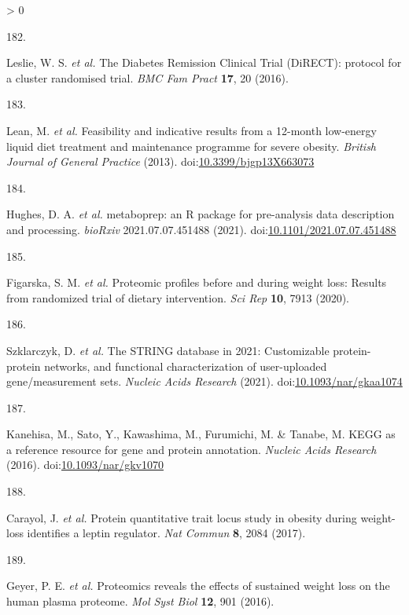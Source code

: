 \documentclass[11pt,twoside]{bristolthesis}
\newlength{\cslhangindent}
\newlength{\csllabelwidth}
\newenvironment{CSLReferences}[2] %
 {%
  \setlength{\parindent}{0pt}
  \ifodd #1 \everypar{\setlength{\hangindent}{\cslhangindent}}\ignorespaces\fi
  \ifnum #2 > 0
  \setlength{\parskip}{#2\baselineskip}
  \fi
 }%
 {}
\newcommand{\CSLLeftMargin}[1]{\parbox[t]{\csllabelwidth}{#1}}
\newcommand{\CSLRightInline}[1]{\parbox[t]{\linewidth - \csllabelwidth}{#1}\break}
\begin{document}
\begin{CSLReferences}{0}{0}
\leavevmode\hypertarget{ref-Leslie2016}{}%
\CSLLeftMargin{182. }
\CSLRightInline{Leslie, W. S. \emph{et al.} {The Diabetes Remission Clinical Trial (DiRECT): protocol for a cluster randomised trial}. \emph{BMC Fam Pract} \textbf{17}, 20 (2016).}

\leavevmode\hypertarget{ref-Lean2013}{}%
\CSLLeftMargin{183. }
\CSLRightInline{Lean, M. \emph{et al.} {Feasibility and indicative results from a 12-month low-energy liquid diet treatment and maintenance programme for severe obesity}. \emph{British Journal of General Practice} (2013). doi:\href{https://doi.org/10.3399/bjgp13X663073}{10.3399/bjgp13X663073}}

\leavevmode\hypertarget{ref-Hughes2021}{}%
\CSLLeftMargin{184. }
\CSLRightInline{Hughes, D. A. \emph{et al.} {metaboprep: an R package for pre-analysis data description and processing}. \emph{bioRxiv} 2021.07.07.451488 (2021). doi:\href{https://doi.org/10.1101/2021.07.07.451488}{10.1101/2021.07.07.451488}}

\leavevmode\hypertarget{ref-Figarska2020}{}%
\CSLLeftMargin{185. }
\CSLRightInline{Figarska, S. M. \emph{et al.} {Proteomic profiles before and during weight loss: Results from randomized trial of dietary intervention}. \emph{Sci Rep} \textbf{10}, 7913 (2020).}

\leavevmode\hypertarget{ref-Szklarczyk2021}{}%
\CSLLeftMargin{186. }
\CSLRightInline{Szklarczyk, D. \emph{et al.} {The STRING database in 2021: Customizable protein-protein networks, and functional characterization of user-uploaded gene/measurement sets}. \emph{Nucleic Acids Research} (2021). doi:\href{https://doi.org/10.1093/nar/gkaa1074}{10.1093/nar/gkaa1074}}

\leavevmode\hypertarget{ref-Kanehisa2016}{}%
\CSLLeftMargin{187. }
\CSLRightInline{Kanehisa, M., Sato, Y., Kawashima, M., Furumichi, M. \& Tanabe, M. {KEGG as a reference resource for gene and protein annotation}. \emph{Nucleic Acids Research} (2016). doi:\href{https://doi.org/10.1093/nar/gkv1070}{10.1093/nar/gkv1070}}

\leavevmode\hypertarget{ref-Carayol2017}{}%
\CSLLeftMargin{188. }
\CSLRightInline{Carayol, J. \emph{et al.} {Protein quantitative trait locus study in obesity during weight-loss identifies a leptin regulator}. \emph{Nat Commun} \textbf{8}, 2084 (2017).}

\leavevmode\hypertarget{ref-Geyer2016}{}%
\CSLLeftMargin{189. }
\CSLRightInline{Geyer, P. E. \emph{et al.} {Proteomics reveals the effects of sustained weight loss on the human plasma proteome}. \emph{Mol Syst Biol} \textbf{12}, 901 (2016).}


\end{CSLReferences}
\end{document}

